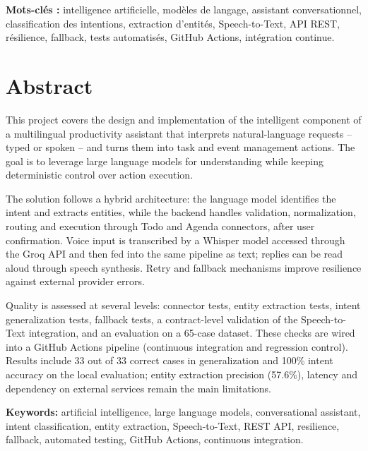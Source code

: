 \documentclass[11pt,a4paper,openany,oneside]{report}
\begin{document}
\medskip\noindent\textbf{Mots-cl\'es :} intelligence artificielle, mod\`eles de langage, assistant conversationnel, classification des intentions, extraction d'entit\'es, Speech-to-Text, API REST, r\'esilience, fallback, tests automatis\'es, GitHub Actions, int\'egration continue.

\chapter*{Abstract}
This project covers the design and implementation of the intelligent component of a multilingual productivity assistant that interprets natural-language requests -- typed or spoken -- and turns them into task and event management actions. The goal is to leverage large language models for understanding while keeping deterministic control over action execution.

The solution follows a hybrid architecture: the language model identifies the intent and extracts entities, while the backend handles validation, normalization, routing and execution through Todo and Agenda connectors, after user confirmation. Voice input is transcribed by a Whisper model accessed through the Groq API and then fed into the same pipeline as text; replies can be read aloud through speech synthesis. Retry and fallback mechanisms improve resilience against external provider errors.

Quality is assessed at several levels: connector tests, entity extraction tests, intent generalization tests, fallback tests, a contract-level validation of the Speech-to-Text integration, and an evaluation on a 65-case dataset. These checks are wired into a GitHub Actions pipeline (continuous integration and regression control). Results include 33 out of 33 correct cases in generalization and 100\% intent accuracy on the local evaluation; entity extraction precision (57.6\%), latency and dependency on external services remain the main limitations.

\medskip\noindent\textbf{Keywords:} artificial intelligence, large language models, conversational assistant, intent classification, entity extraction, Speech-to-Text, REST API, resilience, fallback, automated testing, GitHub Actions, continuous integration.

\tableofcontents
\clearpage
{}
\listoffigures
\clearpage
{}
\listoftables
\end{document}
